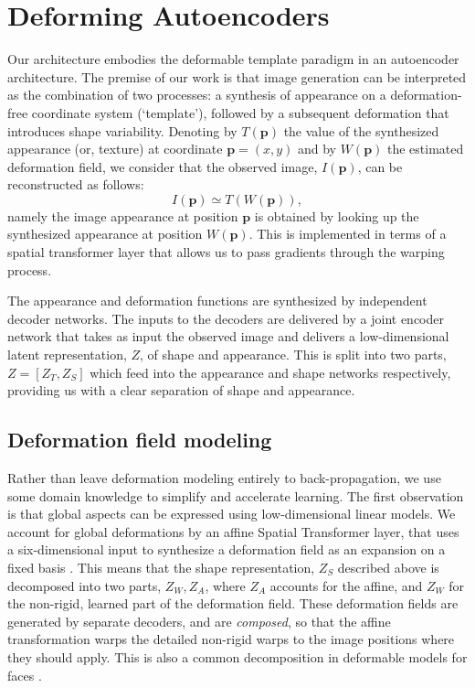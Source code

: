 \documentclass[runningheads]{llncs}
\begin{document}
\section{Deforming Autoencoders}


\newcommand{\obs}{I} \newcommand{\shp}{W}
\newcommand{\temp}{T} \newcommand{\xj}{\mathbf{p}}
\newcommand{\xy}{(x,y)}
\newcommand{\shb}{W} \newcommand{\beq}{\begin{equation}}
\newcommand{\eeq}{\end{equation}}
\newcommand{\ba}{\begin{equation*}}
\newcommand{\ea}{\end{equation*}}

Our architecture embodies the deformable template  paradigm in an autoencoder architecture. The  premise of our work is that 
image generation can be interpreted as the combination of two processes: a synthesis of appearance on a deformation-free coordinate system (`template'), followed by a subsequent deformation that introduces shape variability. 
Denoting by $\temp(\xj)$ the value of the synthesized appearance (or, texture) at coordinate $\xj = \xy$ and by $\shb(\xj)$ the estimated deformation field, we consider that the observed image, $\obs(\xj)$, can be reconstructed as follows:
\beq
\obs(\xj) \simeq \temp(\shp(\xj)),
\eeq 
namely  the image appearance at position $\xj$ is obtained by looking up the synthesized appearance at position $\shp(\xj)$. This is implemented in terms of a spatial transformer layer \cite{JaderbergSZK15} that allows us to pass gradients through the warping process.

The appearance and deformation functions are synthesized
by independent decoder networks. The inputs to the
decoders are delivered by a joint encoder network that takes
as input the observed image and delivers a low-dimensional
latent representation, $Z$, of shape and appearance. This is
split into two parts, $Z = [Z_T, Z_S]$ which feed into the appearance and shape networks respectively, providing us with a clear separation of shape and appearance.

\subsection{Deformation field modeling}
Rather than leave deformation modeling entirely to back-propagation, we use some domain knowledge to simplify and accelerate learning. The first  observation is that global aspects can be expressed using low-dimensional linear models. We account for global deformations by an affine Spatial Transformer layer, that uses a six-dimensional input to synthesize a deformation field as an expansion on a fixed basis \cite{JaderbergSZK15}.
This means that the shape representation, $Z_S$ described above is decomposed into two parts, $Z_W,Z_A$, where $Z_A$ accounts for the affine, and $Z_W$ for the non-rigid, learned part of the deformation field. 
These deformation fields are generated by separate decoders, and are {\em composed}, so that the affine transformation warps the detailed non-rigid warps to the image positions where they should apply. This is also a common decomposition in deformable models for faces \cite{cootes1998active,MaBa04}. 
\end{document}
